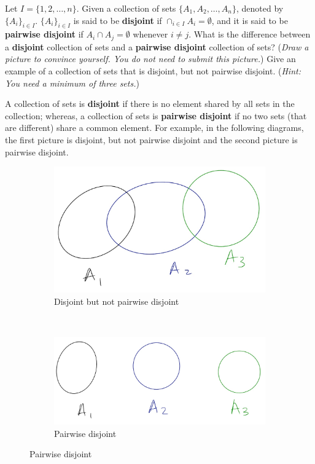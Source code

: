 \documentclass{article}
\theoremstyle{definition}
\begin{document}
\begin{question}
   Let $I=\{1, 2, \dots, n\}$. Given a collection of sets $\{A_1,A_2,\dots, A_n\}$, denoted by $\{A_i\}_{i\in I}$. $\{A_i\}_{i\in I}$ is said to be \textbf{disjoint} if $\cap_{i\in I}A_i=\emptyset$, and it is said to be \textbf{pairwise disjoint} if $A_i\cap A_j=\emptyset$ whenever $i\neq j$. What is the difference between a \textbf{disjoint} collection of sets and a \textbf{pairwise disjoint} collection of sets? (\textit{Draw a picture to convince yourself. You do not need to submit this picture.}) Give an example of a collection of sets that is disjoint, but not pairwise disjoint. (\textit{Hint: You need a minimum of three sets.})
\end{question}
\begin{solution}
A collection of sets is \textbf{disjoint} if there is no element shared by all sets in the collection; whereas, a collection of sets is \textbf{pairwise disjoint} if no two sets (that are different) share a common element. For example, in the following diagrams, the first picture is disjoint, but not pairwise disjoint and the second picture is pairwise disjoint.
\begin{figure}[h]
\centering
	\begin{subfigure}[h]{.35\textwidth}
	\includegraphics[width=\textwidth]{disjoint}
	\caption{Disjoint but not pairwise disjoint}
	\end{subfigure}
	~\quad\hspace{1cm}
	\begin{subfigure}[h]{.35\textwidth}
	\includegraphics[width=\textwidth]{pair-disjoint}
	\caption{Pairwise disjoint}
	\end{subfigure}	
\end{figure}



\end{solution}
\end{document}

